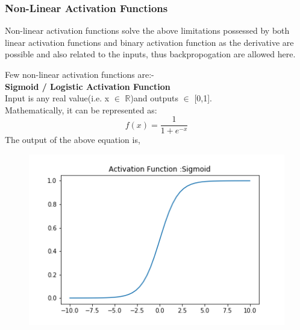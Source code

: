  
\subsubsection{Non-Linear Activation Functions}

Non-linear activation functions solve the above limitations possessed by both linear activation functions and binary activation function as the derivative are possible and also related to the inputs, thus backpropogation are allowed here.

Few non-linear activation functions are:-\\
\textbf{Sigmoid / Logistic Activation Function}\\
Input is any real value(i.e. x $\in$ $\mathbb{R}$)and outputs $\in$ [0,1].\\
Mathematically, it can be represented as:\\
\begin{equation}
    f(x) = \frac{1}{1+e^{-x}}
\end{equation}
The output of the above equation is,
\begin{figure}[H]
    \centering
    \includegraphics{Figures/sigmoid.png}
    \label{fig:my_label}
\end{figure}

